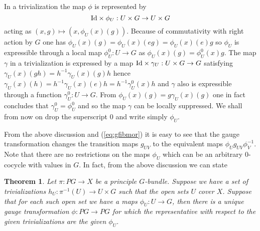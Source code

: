 \documentclass[12pt,titlepage]{article}
\def\Id{\hbox{Id}}
\newtheorem{theorem}{Theorem}
\begin{document}
In a  trivialization the map \(\phi\) is represented by
\[
\Id\times\phi_U:U\times G \to U\times G
\]
 acting as \((x,g) \mapsto
(x,
\phi_U(x)(g))\). Because of commutativity with right action by \(G\) one
has \(\phi_U(x)(g) = \phi_U(x)(eg) = \phi_U(x)(e)g\) so \(\phi_U\) is
expressible through a local map \(\phi_U^0:U\to G\) as \(\phi_U(x)(g) =
\phi_U^0(x)g\). The map \(\gamma\) in a trivialization is expressed
by a map \(\Id\times\gamma_U:U\times G \to G\) satisfying
\(\gamma_U(x)(gh) = h^{-1}\gamma_U(x)(g) h\) hence \(\gamma_U(x)(h) =
h^{-1}\gamma_U(x)(e) h = h^{-1}\gamma_U^0(x) h\) and \(\gamma\) also is
expressible through a function \(\gamma_U^0:U\to G\). From
\(\phi_U(x)(g) = g\gamma_U(x)(g)\) one in fact concludes that \(\gamma_U^0
=
\phi_U^0\) and so the map \(\gamma\) can be locally suppressed.
We shall from now on drop the superscript \(0\) and write simply
\(\phi_U\).

From the above discussion and (\ref{eq:gfibmor}) 
it is easy to see that the gauge
transformation changes the transition maps \(g_{UV}\) to the equivalent
maps \(\phi_Ug_{UV}\phi_V^{-1}\). Note that there are no restrictions on
the maps \(\phi_U\) which can be an arbitrary \(0\)-cocycle with values
in \(G\). In fact, from the above discussion we can state
\begin{theorem}
Let \(\pi:PG\to X\) be a principle \(G\)-bundle. Suppose
we have a set of  trivializations \(h_U:\pi^{-1}(U)\to U\times G\) 
such that the open sets \(U\) cover \(X\).  Suppose that for each
such open set we have a maps 
\(\phi_U:U\to G\), then there is a
unique gauge transformation  \(\phi:PG\to PG\) for which the  
representative with
respect to the given trivializations are the given \(\phi_U\).
\end{theorem}%
\end{document}
